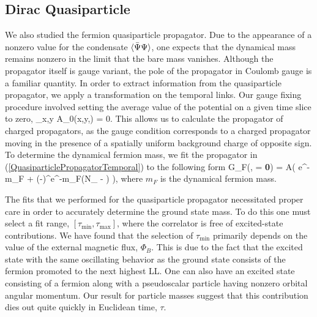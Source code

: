 \documentclass[aps,prd,twocolumn,showpacs,superscriptaddress,groupedaddress]{revtex4}  %
\begin{document}

\subsection{\label{sec:DiracQuasi}Dirac Quasiparticle}
We also studied the fermion quasiparticle propagator. Due to the appearance of a nonzero value for the condensate ${\langle {\bar \Psi} \Psi \rangle}$, one expects that the dynamical mass remains nonzero in the limit that the bare mass vanishes. 
Although the propagator itself is gauge variant, the pole of the propagator in Coulomb gauge is a familiar quantity. In order to extract information from the quasiparticle propagator, we apply a transformation on the temporal links. Our gauge fixing procedure involved setting the average value of the potential on a given time slice to zero, 
\beq
\sum_{x,y} A_0(x,y,\tau) = 0.
\eeq
This allows us to calculate the propagator of charged propagators, as the gauge condition corresponds to a charged propagator moving in the presence of a spatially uniform background charge of opposite sign.
To determine the dynamical fermion mass, we fit the propagator in (\ref{QuasiparticlePropagatorTemporal}) to the following form
\beq
\label{FermFitForm} 
G_F(\tau,  = {\bf 0}) = A\left( e^{-m_F\tau} + (-)^{\tau}e^{-m_F(N_{\tau} - \tau)} \right),
\eeq
where $m_F$ is the dynamical fermion mass. 

The fits that we performed for the quasiparticle propagator necessitated proper care in order to accurately determine the ground state mass. To do this one must select a fit range, $[ \tau_{\text{min}}, \tau_{\text{max}}]$, where the correlator is free of excited-state contributions. We have found that the selection of $\tau_{\text{min}}$ primarily depends on the value of the external magnetic flux, $\Phi_B$. This is due to the fact that the excited state with the same oscillating behavior as the ground state consists of the fermion promoted to the next highest LL. One can also have an excited state consisting of a fermion along with a pseudoscalar particle having nonzero orbital angular momentum. Our result for particle masses suggest that this contribution dies out quite quickly in Euclidean time, $\tau$.
\end{document}
